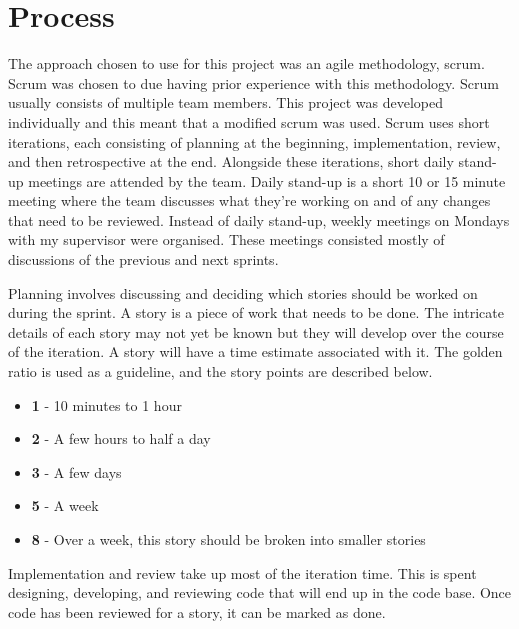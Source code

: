 \section{Process}
\label{sec:process}
The approach chosen to use for this project was an agile methodology, scrum. Scrum was chosen to due having prior experience with this methodology. Scrum usually consists of multiple team members. This project was developed individually and this meant that a modified scrum was used. Scrum uses short iterations, each consisting of planning at the beginning, implementation, review, and then retrospective at the end. Alongside these iterations, short daily stand-up meetings are attended by the team. Daily stand-up is a short 10 or 15 minute meeting where the team discusses what they're working on and of any changes that need to be reviewed. Instead of daily stand-up, weekly meetings on Mondays with my supervisor were organised. These meetings consisted mostly of discussions of the previous and next sprints.

Planning involves discussing and deciding which stories should be worked on during the sprint. A story is a piece of work that needs to be done. The intricate details of each story may not yet be known but they will develop over the course of the iteration. A story will have a time estimate associated with it. The golden ratio is used as a guideline, and the story points are described below.

\begin{itemize}
  \item \textbf{1} - 10 minutes to 1 hour
  \item \textbf{2} - A few hours to half a day
  \item \textbf{3} - A few days
  \item \textbf{5} - A week
  \item \textbf{8} - Over a week, this story should be broken into smaller stories
\end{itemize}

Implementation and review take up most of the iteration time. This is spent designing, developing, and reviewing code that will end up in the code base. Once code has been reviewed for a story, it can be marked as done. 

